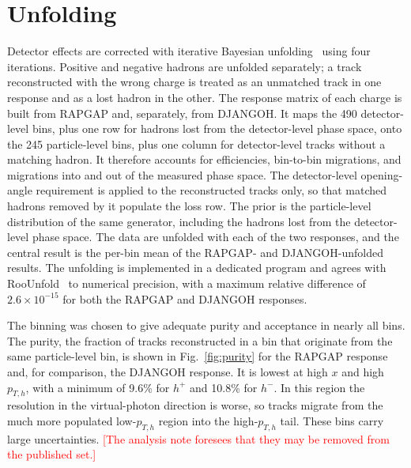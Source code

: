 \documentclass[11pt,a4paper]{article}
\newcommand{\pTh}{p_{T,h}}
\newcommand{\hplus}{h^{+}}
\newcommand{\hminus}{h^{-}}
\newcommand{\draft}[1]{\textcolor{red}{#1}}
\begin{document}
\section{Unfolding}
\label{sec:unfolding}

Detector effects are corrected with iterative Bayesian unfolding~\cite{DAgostini:1995fv} using four iterations. Positive and negative hadrons are unfolded separately; a track reconstructed with the wrong charge is treated as an unmatched track in one response and as a lost hadron in the other. The response matrix of each charge is built from RAPGAP and, separately, from DJANGOH. It maps the 490 detector-level bins, plus one row for hadrons lost from the detector-level phase space, onto the 245 particle-level bins, plus one column for detector-level tracks without a matching hadron. It therefore accounts for efficiencies, bin-to-bin migrations, and migrations into and out of the measured phase space. The detector-level opening-angle requirement is applied to the reconstructed tracks only, so that matched hadrons removed by it populate the loss row. The prior is the particle-level distribution of the same generator, including the hadrons lost from the detector-level phase space. The data are unfolded with each of the two responses, and the central result is the per-bin mean of the RAPGAP- and DJANGOH-unfolded results. The unfolding is implemented in a dedicated program and agrees with RooUnfold~\cite{Adye:2011gm} to numerical precision, with a maximum relative difference of $2.6\times10^{-15}$ for both the RAPGAP and DJANGOH responses.

The binning was chosen to give adequate purity and acceptance in nearly all bins. The purity, the fraction of tracks reconstructed in a bin that originate from the same particle-level bin, is shown in Fig.~\ref{fig:purity} for the RAPGAP response and, for comparison, the DJANGOH response. It is lowest at high $x$ and high $\pTh$, with a minimum of 9.6\% for $\hplus$ and 10.8\% for $\hminus$. In this region the resolution in the virtual-photon direction is worse, so tracks migrate from the much more populated low-$\pTh$ region into the high-$\pTh$ tail. These bins carry large uncertainties. \draft{[The analysis note foresees that they may be removed from the published set.]}
\end{document}
